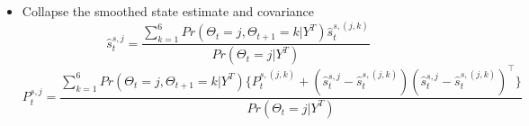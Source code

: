 \documentclass[12pt,letter,leqno]{article}
\theoremstyle{asn}
\theoremstyle{lem}
\theoremstyle{slem}
\theoremstyle{prop}
\theoremstyle{appprop}
\theoremstyle{rem}
\theoremstyle{defn}
\begin{document}
\begin{itemize}
\begin{itemize}
\begin{itemize}
\item \( P_t^{s,(j,k)} = P_t^j + K_t^{s,(j,k)}(P_{t+1}^{s,k} - P_{t+1}^{-(j,k)})(K_t^{s,(j,k)})^\top \)
\end{itemize}
\item Collapse the smoothed state estimate and covariance
\begin{equation*}
   \hat{s}_t^{s,j} = \frac{\sum_{k=1}^6 Pr(\Theta_t=j,\Theta_{t+1}=k|Y^T)\hat{s}_t^{s,(j,k)}}{Pr(\Theta_t=j|Y^T)}
\end{equation*}
\begin{equation*}
   P_t^{s,j} = \frac{\sum_{k=1}^6 Pr(\Theta_t=j,\Theta_{t+1}=k|Y^T)\{P_t^{s,(j,k)}+(\hat{s}_t^{s,j}-\hat{s}_t^{s,(j,k)})(\hat{s}_t^{s,j}-\hat{s}_t^{s,(j,k)})^\top\}}{Pr(\Theta_t=j|Y^T)}
\end{equation*}
\end{itemize}
\end{itemize}
\end{document}
